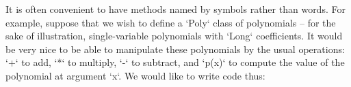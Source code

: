 It is often convenient to have methods named by symbols rather than words.
For example, suppose that we wish to define a \xcd`Poly` class of
polynomials -- for the sake of illustration, single-variable polynomials with
\xcd`Long` coefficients.  It would be very nice to be able to manipulate these
polynomials by the usual operations: \xcd`+` to add, \xcd`*` to multiply,
\xcd`-` to subtract, and \xcd`p(x)` to compute the value of the polynomial at
argument \xcd`x`.  We would like to write code thus: 
%
%
%
%
%
%
%
%
%
%


